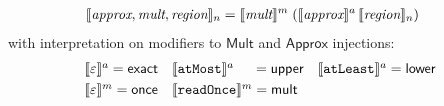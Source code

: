 \begin{align*}
\setlength{\arraycolsep}{0.7em}
& \interp{\textit{approx}, \textit{mult}, \textit{region}}_n
= \interp{\textit{mult}}^m \; (\interp{\textit{approx}}^a \,
\interp{\textit{region}}_n)
\end{align*}
with interpretation on modifiers to $\textsf{Mult}$
and $\textsf{Approx}$ injections:
\begin{align*}
& \begin{array}{lll}
\llbracket{\varepsilon}\rrbracket^{a}   = \textsf{exact} &
\llbracket{\texttt{atMost}}\rrbracket^{a} \hspace{1.3em} = \textsf{upper} &
\llbracket{\texttt{atLeast}}\rrbracket^{a} = \textsf{lower} \\[0.3em]
\llbracket{\varepsilon}\rrbracket^{m} = \textsf{once}
& \llbracket{\texttt{readOnce}}\rrbracket^{m} = \textsf{mult} &
\end{array}\\[-1.5em]
\end{align*}
%


